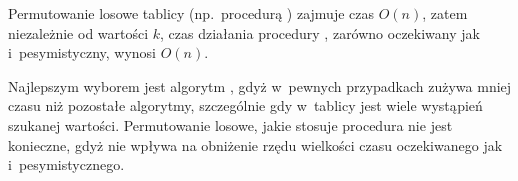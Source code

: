 \subproblem %
Permutowanie losowe tablicy (np.\ procedurą ) zajmuje czas $O(n)$, zatem niezależnie od wartości $k$, czas działania procedury , zarówno oczekiwany jak i~pesymistyczny, wynosi $O(n)$.

\subproblem %
Najlepszym wyborem jest algorytm , gdyż w~pewnych przypadkach zużywa mniej czasu niż pozostałe algorytmy, szczególnie gdy w~tablicy jest wiele wystąpień szukanej wartości. Permutowanie losowe, jakie stosuje procedura  nie jest konieczne, gdyż nie wpływa na obniżenie rzędu wielkości czasu oczekiwanego jak i~pesymistycznego.

\endinput
